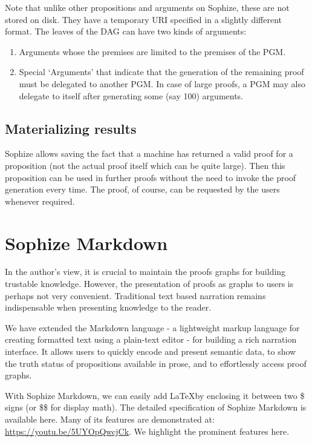\documentclass[a4paper]{article}
\begin{document}
Note that unlike other propositions and arguments on Sophize, these are not stored on disk. They have a temporary URI specified in a slightly different format. The leaves of the DAG can have two kinds of arguments:

\begin{enumerate}
\item Arguments whose the premises are limited to the premises of the PGM.
\item Special `Arguments' that indicate that the generation of the remaining proof must be delegated to another PGM. In case of large proofs, a PGM may also delegate to itself after generating some (say 100) arguments.
\end{enumerate}
\subsection{Materializing results}

Sophize allows saving the fact that a machine has returned a valid proof for a proposition (not the actual proof itself which can be quite large). Then this proposition can be used in further proofs without the need to invoke the proof generation every time. The proof, of course, can be requested by the users whenever required.


\section{Sophize Markdown}

In the author's view, it is crucial to maintain the proofs graphs for building trustable knowledge. However, the presentation of proofs as graphs to users is perhaps not very convenient. Traditional text based narration remains indispensable when presenting knowledge to the reader.

We have extended the Markdown language - a lightweight markup language for creating formatted text using a plain-text editor - for building a rich narration interface. It allows users to quickly encode and present semantic data, to show the truth status of propositions available in prose, and to effortlessly access proof graphs. 

With Sophize Markdown, we can easily add \LaTeX\space by enclosing it between two \$ signs (or \$\$ for display math). The detailed specification of Sophize Markdown is available here. Many of its features are demonstrated at: \url{https://youtu.be/5UYOpQwcjCk}. We highlight the prominent features here.
\end{document}
